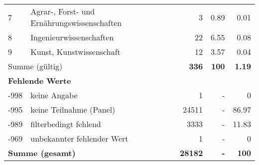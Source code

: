 \begin{longtable}{lXrrr}
     7 &
     \multicolumn{1}{X}{ Agrar-, Forst- und Ernährungswissenschaften   } &


       \num{3} &
       \num[round-mode=places,round-precision=2]{0,89} &
         \num[round-mode=places,round-precision=2]{0,01} \\

     8 &
     \multicolumn{1}{X}{ Ingenieurwissenschaften   } &


       \num{22} &
       \num[round-mode=places,round-precision=2]{6,55} &
         \num[round-mode=places,round-precision=2]{0,08} \\

     9 &
     \multicolumn{1}{X}{ Kunst, Kunstwissenschaft   } &


       \num{12} &
       \num[round-mode=places,round-precision=2]{3,57} &
         \num[round-mode=places,round-precision=2]{0,04} \\
     \midrule
     \multicolumn{2}{l}{Summe (gültig)} &
       \textbf{\num{336}} &
     \textbf{100} &
       \textbf{\num[round-mode=places,round-precision=2]{1,19}} \\
     \multicolumn{5}{l}{\textbf{Fehlende Werte}}\\
       -998 &
       keine Angabe &
         \num{1} &
        - &
         \num[round-mode=places,round-precision=2]{0} \\
       -995 &
       keine Teilnahme (Panel) &
         \num{24511} &
        - &
         \num[round-mode=places,round-precision=2]{86,97} \\
       -989 &
       filterbedingt fehlend &
         \num{3333} &
        - &
         \num[round-mode=places,round-precision=2]{11,83} \\
       -969 &
       unbekannter fehlender Wert &
         \num{1} &
        - &
         \num[round-mode=places,round-precision=2]{0} \\
     \midrule
     \multicolumn{2}{l}{\textbf{Summe (gesamt)}} &
          \textbf{\num{28182}} &
        \textbf{-} &
        \textbf{100} \\
     \bottomrule
     \end{longtable}
     
